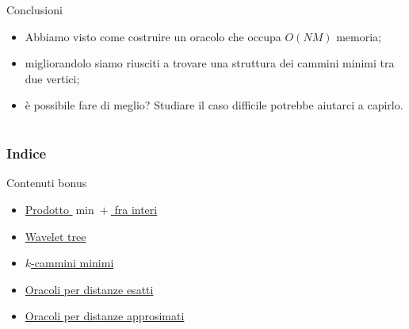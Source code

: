 \documentclass{beamer}
\theoremstyle{plain}
\theoremstyle{definition}
\theoremstyle{remark}
\newcommand{\pa}[1]{\left(#1\right)}
\begin{document}
\begin{frame}{Conclusioni}
  \begin{itemize}
  \item<1-> Abbiamo visto come costruire un oracolo che occupa $O\pa{NM}$
    memoria;
  \item<1-> migliorandolo siamo riusciti a trovare una struttura dei
    cammini minimi tra due vertici;
  \item<2-> \`e possibile fare di meglio? Studiare il caso difficile
    potrebbe aiutarci a capirlo.
  \end{itemize}
\end{frame}


\section*{}

\begin{frame}[plain]
 \frametitle{Indice}
 \tableofcontents
\end{frame}

\begin{frame}{Contenuti bonus}
  \begin{itemize}
  \item \hyperref[frame:prodottointeri]{Prodotto $\min +$ fra interi}
  \item \hyperref[frame:wavelettree]{Wavelet tree}
  \item \hyperref[sec:kcamm]{$k$-cammini minimi}
  \item \hyperref[sec:oracolidist]{Oracoli per distanze esatti}
  \item \hyperref[sec:approx]{Oracoli per distanze approsimati}
  \end{itemize}
\end{frame}
\end{document}
